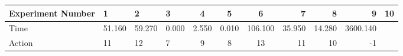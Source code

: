 \documentclass[8pt]{article}
\begin{document}
\begin{landscape}
\begin{tabular}{ | l | l | l | l | c | c | c | r | r | r | r | }
 \hline 
Experiment Number & 1 & 2 & 3 & 4 & 5 & 6 & 7 & 8 & 9 & 10\\ \hline
Time & 51.160 & 59.270 & 0.000 & 2.550 & 0.010 & 106.100 & 35.950 & 14.280 & 3600.140\\ \hline
Action & 11 & 12 & 7 & 9 & 8 & 13 & 11 & 10 & -1\\ \hline\end{tabular}
\end{landscape}
\end{document}

